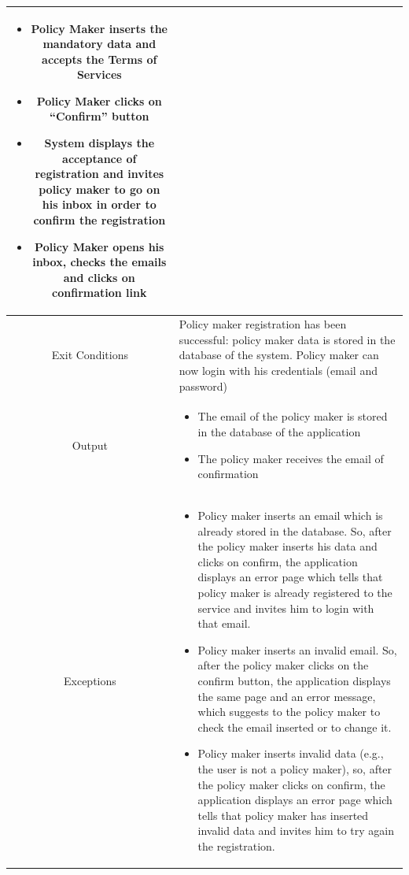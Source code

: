 \documentclass{article}
\begin{document}
\begin{center}
\begin{longtable}{|c| p{10cm}|}
\begin{itemize}
\begin{itemize}
                                            \item Password
                                        \end{itemize}
                                \item Policy Maker inserts the mandatory data and accepts the Terms of Services
                                \item Policy Maker clicks on “Confirm” button
                                \item System displays the acceptance of registration and invites policy maker to go on his inbox in order to confirm the registration
                                \item Policy Maker opens his inbox, checks the emails and clicks on confirmation link
                            \end{itemize} \\
        \hline
            Exit Conditions & Policy maker registration has been successful: policy maker data is stored in the database of the system. 
                            Policy maker can now login with his credentials (email and password) \\
        \hline
            Output & \begin{itemize}
                        \item The email of the policy maker is stored in the database of the application
                        \item The policy maker receives the email of confirmation
                    \end{itemize}\\
        \hline
            Exceptions & \begin{itemize}
                            \item Policy maker inserts an email which is already stored in the database. So, after the policy maker inserts his data and clicks on confirm, the application displays an error page which tells that policy maker is already registered to the service and invites him to login with that email.
                            \item Policy maker inserts an invalid email. So, after the policy maker clicks on the confirm button, the application displays the same page and an error message, which suggests to the policy maker to check the email inserted or to change it.
                            \item Policy maker inserts invalid data (e.g., the user is not a policy maker), so, after the policy maker clicks on confirm, the application displays an error page which tells that policy maker has inserted invalid data and invites him to try again the registration.
                        \end{itemize}\\
        \hline
    \end{longtable}
    

\end{center}
\end{document}
